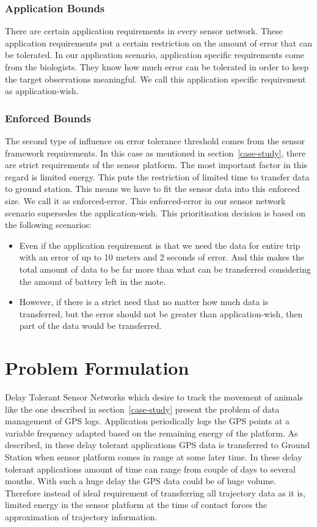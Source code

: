 \documentclass[conference]{IEEEtran}
\begin{document}
\subsubsection{Application Bounds}
There are certain application requirements in every sensor network. These application requirements 
put a certain restriction on the amount of error that can be tolerated. In our application scenario, 
application specific requirements come from the biologists. They know how much error can be tolerated 
in order to keep the target observations meaningful. We call this application specific requirement as 
application-wish.

\subsubsection{Enforced Bounds}
The second type of influence on error tolerance threshold comes from the sensor framework requirements. 
In this case as mentioned in section~\ref{case-study}, there are strict requirements of the sensor platform. 
The most important factor in this regard is limited energy. This puts the restriction of limited time to 
transfer data to ground station. This means we have to fit the sensor data into this enforced size. We 
call it as enforced-error. This enforced-error in our sensor network scenario supersedes the application-wish. 
This prioritisation decision is based on the following scenarios:

\begin{itemize}
\item Even if the application requirement is that we need the data for entire trip with an error of 
up to 10 meters and 2 seconds of error. And this makes the total amount of data to be far more than 
what can be transferred considering the amount of battery left in the mote.
\item However, if there is a strict need that no matter how much data is transferred, but the error 
should not be greater than application-wish, then part of the data would be transferred. 
\end{itemize}

\section{Problem Formulation}\label{sec:problem}

Delay Tolerant Sensor Networks which desire to track the movement of animals like the one described in 
section~\ref{case-study} present the problem of data management of GPS logs. Application periodically 
logs the GPS points at a variable frequency adapted based on the remaining energy of the platform. 
As described, in these delay tolerant applications GPS data is transferred to Ground Station when 
sensor platform comes in range at some later time. In these delay tolerant applications amount of time 
can range from couple of days to several months. With such a huge delay the GPS data could be of huge 
volume. Therefore instead of ideal requirement of transferring all trajectory data as it is, limited energy in 
the sensor platform at the time of contact forces the approximation of trajectory information. \\
\end{document}

